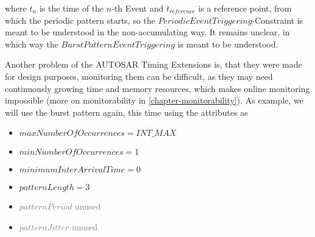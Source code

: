 where $t_n$ is the time of the $n$-th Event and $t_{reference}$ is a reference point, from which the periodic pattern starts, so the $PeriodicEventTriggering$-Constraint is meant to be understood in the non-accumulating way. It remains unclear, in which way the $BurstPatternEventTriggering$ is meant to be understood.

Another problem of the AUTOSAR Timing Extensions is, that they were made for design purposes, monitoring them can be difficult, as they may need continuously growing time and memory resources, which makes online monitoring impossible (more on monitorability in \ref{chapter-monitorability}). As example, we will use the burst pattern again, this time using the attributes as
\begin{itemize}
	\item
		$maxNumberOfOccurrences = INT\_MAX$
	\item
		$minNumberOfOccurrences = 1$
	\item
		$minimumInterArrivalTime = 0$
	\item
		$patternLength = 3$
	\item
		\textcolor{gray}{$patternPeriod$} \textcolor{gray}{unused}
	\item
		\textcolor{gray}{$patternJitter$} \textcolor{gray}{unused}
\end{itemize}

